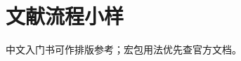 \documentclass[UTF8,fontset=fandol]{ctexart}
\begin{document}
\section{文献流程小样}
中文入门书可作排版参考\autocite{liu2013}；宏包用法优先查官方文档\autocite{latexDocs}。
\printbibliography[title={参考文献}]
\end{document}
